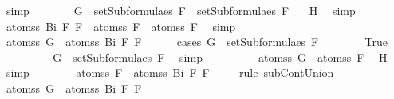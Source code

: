 \begin{isabellebody}
\ simp\isanewline
\ \ \ \ \isamarkupfalse%
\ \isamarkupfalse%
\ {}{\isacharcolon}{\isachardoublequoteopen}G\ {\isasymin}\ setSubformulae{\isacharunderscore}s\ F{}\ {\isasymunion}\ setSubformulae{\isacharunderscore}s\ F{}{\isachardoublequoteclose}\ \isamarkupfalse%
\ {}\ H{}\ \isamarkupfalse%
\ simp\isanewline
\ \ \ \ \isamarkupfalse%
\ {}{\isacharcolon}{\isachardoublequoteopen}atoms{\isacharunderscore}s\ {\isacharparenleft}Bi\ F{}\ F{}{\isacharparenright}\ {\isacharequal}\ atoms{\isacharunderscore}s\ F{}\ {\isasymunion}\ atoms{\isacharunderscore}s\ F{}{\isachardoublequoteclose}\ \isamarkupfalse%
\ simp\isanewline
\ \ \ \ \isamarkupfalse%
\ \isamarkupfalse%
\ {\isachardoublequoteopen}atoms{\isacharunderscore}s\ G\ {\isasymsubseteq}\ atoms{\isacharunderscore}s\ {\isacharparenleft}Bi\ F{}\ F{}{\isacharparenright}{\isachardoublequoteclose}\isanewline
\ \ \ \ \isamarkupfalse%
\ {\isacharparenleft}cases\ {\isachardoublequoteopen}G\ {\isasymin}\ setSubformulae{\isacharunderscore}s\ F{}{\isachardoublequoteclose}{\isacharparenright}\isanewline
\ \ \ \ \ \ \isamarkupfalse%
\ True\isanewline
\ \ \ \ \ \ \isamarkupfalse%
\ \isamarkupfalse%
\ {\isachardoublequoteopen}G\ {\isasymin}\ setSubformulae{\isacharunderscore}s\ F{}{\isachardoublequoteclose}\ \isamarkupfalse%
\ simp\isanewline
\ \ \ \ \ \ \isamarkupfalse%
\ \isamarkupfalse%
\ {}{\isacharcolon}{\isachardoublequoteopen}atoms{\isacharunderscore}s\ G\ {\isasymsubseteq}\ atoms{\isacharunderscore}s\ F{}{\isachardoublequoteclose}\ \isamarkupfalse%
\ H{}\ \isamarkupfalse%
\ simp\isanewline
\ \ \ \ \ \ \isamarkupfalse%
\ {}{\isacharcolon}{\isachardoublequoteopen}atoms{\isacharunderscore}s\ F{}\ {\isasymsubseteq}\ atoms{\isacharunderscore}s\ {\isacharparenleft}Bi\ F{}\ F{}{\isacharparenright}{\isachardoublequoteclose}\ \isamarkupfalse%
\ {}\ \isamarkupfalse%
\ {\isacharparenleft}rule\ subContUnion{}{\isacharparenright}\isanewline
\ \ \ \ \ \ \isamarkupfalse%
\ {\isachardoublequoteopen}atoms{\isacharunderscore}s\ G\ {\isasymsubseteq}\ atoms{\isacharunderscore}s\ {\isacharparenleft}Bi\ F{}\ F{}{\isacharparenright}{\isachardoublequoteclose}\ \isamarkupfalse%

\end{isabellebody}
